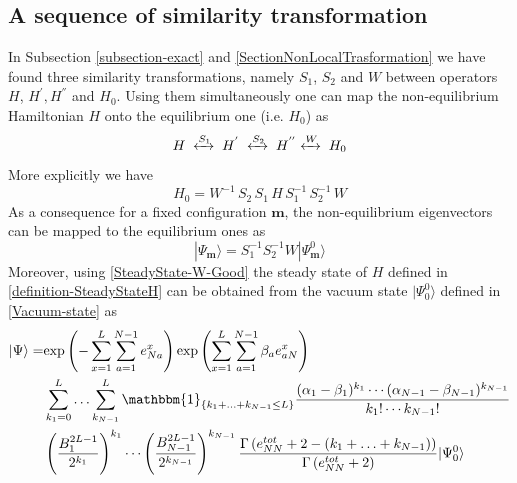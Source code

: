 \documentclass[10pt]{article}
\numberwithin{equation}{section}
\numberwithin{equation}{subsection}
\begin{document}
\subsection{A sequence of similarity transformation}
In Subsection \ref{subsection-exact} and \ref{SectionNonLocalTrasformation} we have found three similarity transformations, namely $S_{1}$, $S_{2}$ and $W$ between operators $H$, $H^{'},H^{''}$ and $H_{0}$. Using them simultaneously one can map the non-equilibrium Hamiltonian $H$ onto the equilibrium one (i.e. $H_{0}$) as
\begin{equation}
	H\;\xleftrightarrow{S_{1}}\;H^{'}\;\xleftrightarrow{S_{2}}\;H^{''}\xleftrightarrow{W}\;H_{0}
\end{equation} 
More explicitly we have 
\begin{equation}
	H_{0}=W^{-1}\,S_{2}\,S_{1}\,H\,S_{1}^{-1}\,S_{2}^{-1}\,W
\end{equation}
As a consequence for a fixed configuration $\bm{m}$, the non-equilibrium eigenvectors can be mapped to the equilibrium ones as
\begin{equation}
	|\Psi_{\bm{m}}\rangle=S_{1}^{-1}S_{2}^{-1}W|\Psi_{\bm{m}}^{0}\rangle
\end{equation}
Moreover, using \eqref{SteadyState-W-Good} the steady state of $H$ defined in \eqref{definition-SteadyStateH} can be obtained from the vacuum state $|\Psi_{0}^{0}\rangle$ defined in \eqref{Vacuum-state} as
\begin{align}
	|\Psi\rangle=&\text{exp}\left(-\sum_{x=1}^{L}\sum_{a=1}^{N-1}e_{Na}^{x}\right)\text{exp}\left(\sum_{x=1}^{L}\sum_{a=1}^{N-1}\beta_{a}e_{aN}^{x}\right)\\&
	\sum_{k_{1}=0}^{L}\ldots\sum_{k_{N-1}}^{L}\mathbbm{1}_{\{k_{1}+\ldots+k_{N-1}\leq L\}}\frac{(\alpha_{1}-\beta_{1})^{k_{1}}\cdots (\alpha_{N-1}-\beta_{N-1})^{k_{N-1}}}{k_{1}!\cdots k_{N-1}!}\\&
	\left(\frac{B_{1}^{2L-1}}{2^{k_{1}}}\right)^{k_{1}}\cdots\left( \frac{B_{N-1}^{2L-1}}{2^{k_{N-1}}}\right)^{k_{N-1}}\frac{\Gamma\left(e_{NN}^{tot}+2-(k_{1}+\ldots+k_{N-1})\right)}{\Gamma\left(e_{NN}^{tot}+2\right)}|\Psi_{0}^{0}\rangle
\end{align}
\end{document}
